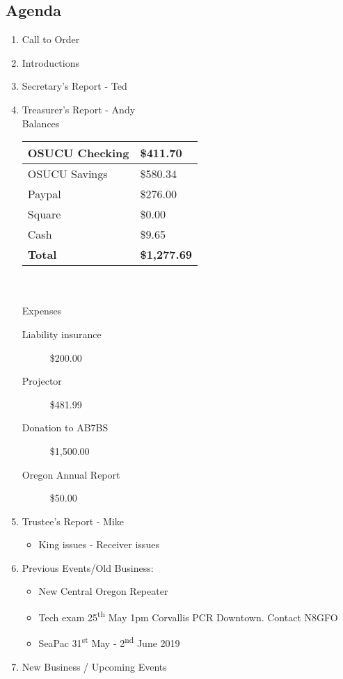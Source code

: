 \documentclass[letter,11pt]{extarticle}
\begin{document}
	\subsection*{Agenda}
	\begin{enumerate}
		\item Call to Order
		\item Introductions
		\item Secretary's Report - Ted
		\item Treasurer's Report - Andy \\
				Balances 
			\begin{tabular}{|l|l|} \hline
				OSUCU Checking & \$411.70 \\ \hline
				OSUCU Savings & \$580.34 \\ \hline
				Paypal & \$276.00 \\ \hline
				Square & \$0.00 \\ \hline
				Cash & \$9.65 \\ \hline
				\textbf{Total} & \textbf{\$1,277.69} \\ \hline
			\end{tabular} \\ \\
			Expenses
			\begin{description}
				\item[Liability insurance] \$200.00
				\item[Projector] \$481.99
				\item[Donation to AB7BS] \$1,500.00
				\item[Oregon Annual Report] \$50.00
			\end{description}
		\item Trustee's Report - Mike
			\begin{itemize}
				\item King issues - Receiver issues
			\end{itemize}
		\item Previous Events/Old Business:
		\begin{itemize}
				\item New Central Oregon Repeater
\item Tech exam 25\textsuperscript{th} May 1pm Corvallis PCR Downtown. Contact N8GFO
\item SeaPac 31\textsuperscript{st} May - 2\textsuperscript{nd} June 2019
		\end{itemize}
			
		\item  New Business / Upcoming Events
			\begin{itemize}


\end{itemize}
\end{enumerate}
\end{document}
